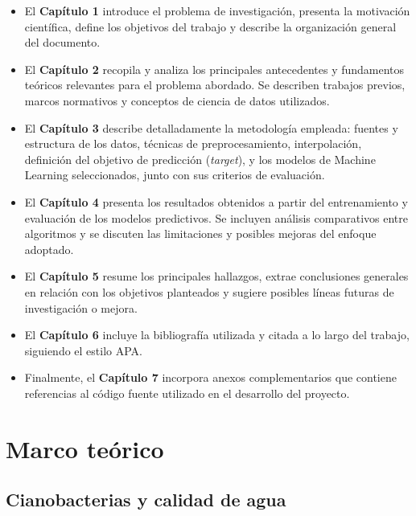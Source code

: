 \documentclass[11pt]{report}
\begin{document}
\begin{itemize}
  \item El \textbf{Capítulo 1} introduce el problema de investigación, presenta la motivación científica, define los objetivos del trabajo y describe la organización general del documento.
  
  \item El \textbf{Capítulo 2} recopila y analiza los principales antecedentes y fundamentos teóricos relevantes para el problema abordado. Se describen trabajos previos, marcos normativos y conceptos de ciencia de datos utilizados.
  
  \item El \textbf{Capítulo 3} describe detalladamente la metodología empleada: fuentes y estructura de los datos, técnicas de preprocesamiento, interpolación, definición del objetivo de predicción (\textit{target}), y los modelos de Machine Learning seleccionados, junto con sus criterios de evaluación.
  
  \item El \textbf{Capítulo 4} presenta los resultados obtenidos a partir del entrenamiento y evaluación de los modelos predictivos. Se incluyen análisis comparativos entre algoritmos y se discuten las limitaciones y posibles mejoras del enfoque adoptado.
  
  \item El \textbf{Capítulo 5} resume los principales hallazgos, extrae conclusiones generales en relación con los objetivos planteados y sugiere posibles líneas futuras de investigación o mejora.
  
  \item El \textbf{Capítulo 6} incluye la bibliografía utilizada y citada a lo largo del trabajo, siguiendo el estilo APA.
  
  \item Finalmente, el \textbf{Capítulo 7} incorpora anexos complementarios que contiene referencias al código fuente utilizado en el desarrollo del proyecto.
\end{itemize}


\chapter{Marco teórico}

\section{Cianobacterias y calidad de agua}
\end{document}
